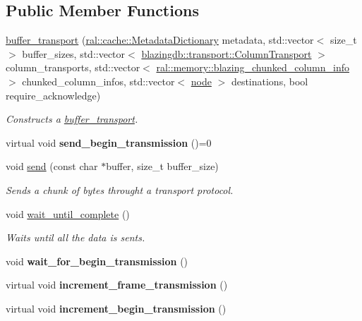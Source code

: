 \subsection*{Public Member Functions}
\begin{DoxyCompactItemize}
\item 
\hyperlink{classcomm_1_1buffer__transport_a012bb1c7d1f7a2e9512815cafd95ef80}{buffer\+\_\+transport} (\hyperlink{classral_1_1cache_1_1MetadataDictionary}{ral\+::cache\+::\+Metadata\+Dictionary} metadata, std\+::vector$<$ size\+\_\+t $>$ buffer\+\_\+sizes, std\+::vector$<$ \hyperlink{structblazingdb_1_1transport_1_1ColumnTransport}{blazingdb\+::transport\+::\+Column\+Transport} $>$ column\+\_\+transports, std\+::vector$<$ \hyperlink{structral_1_1memory_1_1blazing__chunked__column__info}{ral\+::memory\+::blazing\+\_\+chunked\+\_\+column\+\_\+info} $>$ chunked\+\_\+column\+\_\+infos, std\+::vector$<$ \hyperlink{classcomm_1_1node}{node} $>$ destinations, bool require\+\_\+acknowledge)
\begin{DoxyCompactList}\small\item\em Constructs a \hyperlink{classcomm_1_1buffer__transport}{buffer\+\_\+transport}. \end{DoxyCompactList}\item 
\mbox{\label{classcomm_1_1buffer__transport_a0ea6dd0f6412b2422cc47706ad34dad9}} 
virtual void {\bfseries send\+\_\+begin\+\_\+transmission} ()=0
\item 
void \hyperlink{classcomm_1_1buffer__transport_a0a7ae6691d0a182c4567f3001f96aefe}{send} (const char $\ast$buffer, size\+\_\+t buffer\+\_\+size)
\begin{DoxyCompactList}\small\item\em Sends a chunk of bytes throught a transport protocol. \end{DoxyCompactList}\item 
\mbox{\label{classcomm_1_1buffer__transport_aef710177ed4367311b1d8e70acead7c2}} 
void \hyperlink{classcomm_1_1buffer__transport_aef710177ed4367311b1d8e70acead7c2}{wait\+\_\+until\+\_\+complete} ()
\begin{DoxyCompactList}\small\item\em Waits until all the data is sents. \end{DoxyCompactList}\item 
\mbox{\label{classcomm_1_1buffer__transport_a6388e67a79f9a5c2e80ed45b23e6327c}} 
void {\bfseries wait\+\_\+for\+\_\+begin\+\_\+transmission} ()
\item 
\mbox{\label{classcomm_1_1buffer__transport_a3b921d1808fb74d95f83146de5269cb6}} 
virtual void {\bfseries increment\+\_\+frame\+\_\+transmission} ()
\item 
\mbox{\label{classcomm_1_1buffer__transport_a81080122f0355dae745d7bf6453152a8}} 
virtual void {\bfseries increment\+\_\+begin\+\_\+transmission} ()
\end{DoxyCompactItemize}
